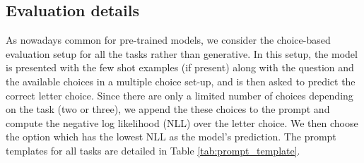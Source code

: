 \subsection{Evaluation details}
As nowadays common for pre-trained models, we consider the choice-based evaluation setup for all the tasks rather than generative. 
In this setup, the model is presented with the few shot examples (if present) along with the question and the available choices in a multiple choice set-up, and is then asked to predict the correct letter choice.
Since there are only a limited number of choices depending on the task (two or three), we append the these choices to the prompt and compute the negative log likelihood (NLL) over the letter choice. 
We then choose the option which has the lowest NLL as the model's prediction. 
The prompt templates for all tasks are detailed in Table \ref{tab:prompt_template}.


